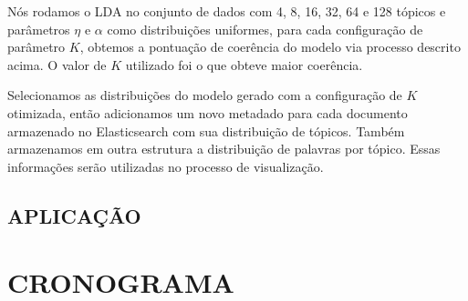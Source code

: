 \documentclass[12pt,a4paper]{article}
\begin{document}
  Nós rodamos o LDA no conjunto de dados com 4, 8, 16, 32, 64 e 128 tópicos e parâmetros $\eta$ e $\alpha$ como distribuições uniformes, para cada configuração de parâmetro $K$, obtemos a pontuação de coerência do modelo via processo descrito acima. O valor de $K$ utilizado foi o que obteve maior coerência.
  
  Selecionamos as distribuições do modelo gerado com a configuração de $K$ otimizada, então adicionamos um novo metadado para cada documento armazenado no Elasticsearch com sua distribuição de tópicos. Também armazenamos em outra estrutura a distribuição de palavras por tópico. Essas informações serão utilizadas no processo de visualização.
  
  \subsection{APLICAÇÃO}
  
  \section{CRONOGRAMA}
  
  \def\refname{REFERÊNCIAS BIBLIOGRÁFICAS}
  
  
  
  
\end{document}
